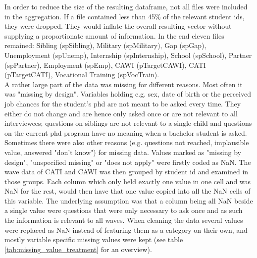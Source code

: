 In order to reduce the size of the resulting dataframe, not all files were included in the aggregation. If a file contained less than 45\% of the relevant student ids, they were dropped. They would inflate the overall resulting vector without supplying a proportionate amount of information. In the end eleven files remained: Sibling (spSibling), Military (spMilitary), Gap (spGap), Unemployment (spUnemp), Internship (spInternship), School (spSchool), Partner (spPartner), Employment (spEmp), CAWI (pTargetCAWI), CATI (pTargetCATI), Vocational Training (spVocTrain).\\
A rather large part of the data was missing for different reasons. Most often it was "missing by design". Variables holding e.g. sex, date of birth or the perceived job chances for the student's phd are not meant to be asked every time. They either do not change and are hence only asked once or are not relevant to all interviewees; questions on siblings are not relevant to a single child and questions on the current phd program have no meaning when a bachelor student is asked. Sometimes there were also other reasons (e.g. questions not reached, implausible value, answered "don't know") for missing data. Values marked as "missing by design", "unspecified missing" or "does not apply" were firstly coded as NaN. The wave data of CATI and CAWI was then grouped by student id and examined in those groups. Each column which only held exactly one value in one cell and was NaN for the rest, would then have that one value copied into all the NaN cells of this variable. The underlying assumption was that a column being all NaN beside a single value were questions that were only necessary to ask once and as such the information is relevant to all waves. When cleaning the data several values were replaced as NaN instead of featuring them as a category on their own, and mostly variable specific missing values were kept (see table \ref{tab:missing_value_treatment} for an overview).\\
